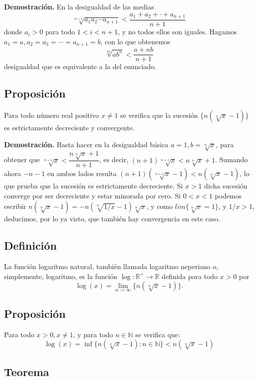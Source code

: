 \documentclass[10pt,a4paper]{article}
\begin{document}
	\textbf{Demostración.} En la desigualdad de las medias $$ \sqrt[n+1]{a_1a_2\cdots a_{n+1}} < \dfrac{a_1 + a_2 + \cdot + a_{n+1}}{n+1}$$
	donde $a_i > 0$ para todo $ 1 < i < n+1$, y no todos ellos son iguales. Hagamos $a_1 = a, a_2 = a_3 = \cdots = a_{n+1} = b$, con lo que obtenemos $$ \sqrt[n1]{ab^n} < \dfrac{a+nb}{n+1}$$ desigualdad que es equivalente a la del enunciado.

	\subsection{Proposición}
	
	Para todo número real positivo $x \neq 1$ se verifica que la sucesión $\{n(\sqrt[n]{x} -1)\}$ es estrictamente decreciente y convergente.
	
	\textbf{Demostración.} Basta hacer en la desigualdad básica $a = 1, b = \sqrt[n]{x}$, para obtener que $\sqrt[n+1]{x} < \dfrac{n\sqrt[n]{x} + 1}{n+1}$, es decir, $(n+1)\sqrt[n+1]{x} < n\sqrt[n]{x} + 1$. Sumando ahora $-n-1$ en ambos lados resulta $(n+1) (\sqrt[n+1]{x} - 1) < n (\sqrt[n]{x} - 1)$, lo que prueba que la sucesión es estrictamente decreciente. Si $x > 1$ dicha sucesión converge por ser decreciente y estar minorada por cero. Si $0 < x < 1$ podemos escribir $n(\sqrt[n]{x} -1) =  -n(\sqrt[n]{1/x} - 1)\sqrt[n]{x}$, y como $lim\{\sqrt[n]{x} = 1\}$, y $1 / x > 1$, deducimos, por lo ya visto, que también hay convergencia en este caso.
	
	\subsection{Definición}
	La función logaritmo natural, también llamada logaritmo neperiano o, simplemente, logaritmo, es la función $\log : \mathbb{R} ^+ \rightarrow \mathbb{R}$ definida para todo $x > 0$ por $$\log(x) = \displaystyle \lim_{n \rightarrow \infty}\{n(\sqrt[n]{x}-1)\}.$$
	
	\subsection{Proposición}
	Para todo $x > 0, x \neq 1$, y para todo $n \in \mathbb{N}$ se verifica que: $$\log(x) = \inf\{n(\sqrt[n]{x}-1) : n \in \mathbb{N}\} < n(\sqrt[n]{x}-1)$$
	
	\subsection{Teorema}
	
\end{document}
